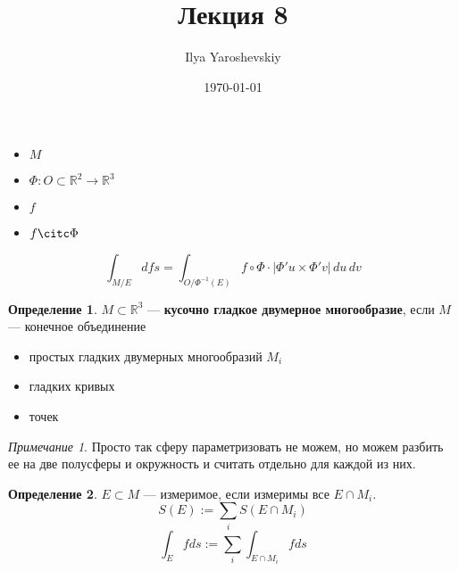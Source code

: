\documentclass[english]{article}
\author{Ilya Yaroshevskiy}
\date{\today}
\title{Лекция 8}
\newcommand{\R}{\mathbb{R}}
\newcommand{\A}{\mathfrak{A}}
\theoremstyle{plain}
\theoremstyle{remark}
\newtheorem*{remark}{Примечание}
\theoremstyle{definition}
\newtheorem*{definition}{Определение}
\begin{document}
\maketitle
\tableofcontents

\newcommand{\A}{\mathfrak{A}}
\newcommand{\esssup}{\mathop{\rm ess\,sup}\limits}


\begin{itemize}
\item \(M\)
\item \(\Phi: O \subset \R^2 \to \R^3\)
\item \(f\)
\item \(f \citc \Phi\)
\end{itemize}
\[ \int_{M/E} d fs = \int_{O/\Phi^{-1}(E)} f \circ \Phi \cdot |\Phi'u\times\Phi'v|\,du\,dv \]
\begin{definition}
\(M \subset \R^3\) --- \textbf{кусочно гладкое двумерное многообразие}, если
\(M\) --- конечное объединение
\begin{itemize}
\item простых гладких двумерных многообразий \(M_i\)
\item гладких кривых
\item точек
\end{itemize}
\end{definition}
\begin{remark}
Просто так сферу параметризовать не можем, но можем разбить ее на две полусферы и окружность и считать отдельно для каждой из них.
\end{remark}
\begin{definition}
\(E \subset M\) --- измеримое, если измеримы все \(E \cap M_i\). \\
\[S(E) := \sum_i S(E\cap M_i) \]
\[ \int_E f ds := \sum_i \int_{E \cap M_i} f ds \]
\end{definition}
\end{document}
